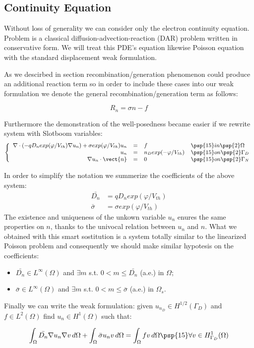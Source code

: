 \subsection{Continuity Equation}

Without loss of generality we can consider only the electron continuity equation. Problem  is a classical diffusion-advection-reaction (DAR) problem written in conservative form. We will treat this PDE's equation likewise Poisson equation with the standard displacement weak formulation.

As we descirbed in section  recombination/generation phenomenon could produce an additional reaction term so in order to include these cases into our weak formulation we denote the general recombination/generation term as follows:

\begin{equation}
R_n = \sigma n - f
\end{equation}

Furthermore the demonstration of the well-posedness became easier if we rewrite system  with Slotboom variables:
\begin{equation}
\small
\left\{
\begin{array}{rcll}
 \nabla \cdot \left( - q D_n exp(\varphi/V_{th})\nabla u_n \right) + \sigma exp(\varphi/V_{th}) u_n& = & f  & \psp{15} in \psp{2} \Omega \\
u_n & = &  n_D exp(-\varphi/V_{th}) & \psp{15} on \psp{2} \Gamma_D \\
\nabla u_n \cdot \vect{n} & = & 0 & \psp{15} on \psp{2} \Gamma_N
\end{array}
\right.
\end{equation}

In order to simplify the notation we summerize the coefficients of the above system:
\begin{align*}
\bar{D_n} & = q D_n exp(\varphi/V_{th}) \\
\bar{\sigma}  & = \sigma exp(\varphi/V_{th})
\end{align*}
The existence and uniqueness of the unkown variable $u_n$ enures the same properties on $n$, thanks to the univocal relation between $u_n$ and $n$.
What we obtained with this smart sostitution is a system totally similar to the linearized Poisson problem and consequently we should make similar hypotesis on the coefficients:
\begin{itemize}
\item $\bar{D_n} \in L^{\infty}(\Omega)$ and $\exists m$ s.t. $0 < m \leq \bar{D_n}$ (a.e.) in $\Omega$;
\item  $\bar{\sigma} \in L^{\infty}(\Omega)$ and $\exists m$ s.t. $0 < m \leq \bar{\sigma}$ (a.e.) in $\Omega_s$.
\end{itemize}
Finally we can write the weak formulation: given $u_{n_D} \in H^{1/2}(\Gamma_D)$ and $f \in L^2(\Omega)$ find $u_n \in H^1(\Omega)$ such that:

\begin{equation}
\label{eq: LEC weakformulation}
\int_{\Omega} \bar{D_n} \nabla u_n \nabla v \, d\Omega + \int_{\Omega} \bar{\sigma} u_n v \, d\Omega = \int_{\Omega} f v \, d\Omega \psp{15} \forall v \in H^1_{\Gamma_D}(\Omega)
\end{equation}
